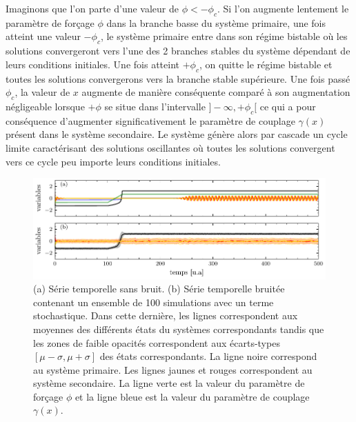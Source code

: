 
Imaginons que l’on parte d’une valeur de $\phi < - \phi_c$. Si l’on augmente lentement le paramètre de forçage $\phi$ dans la branche basse du système primaire, une fois atteint une valeur $-\phi_c$, le système primaire entre dans son régime bistable où les solutions convergeront vers l’une des 2 branches stables du système dépendant de leurs conditions initiales. Une fois atteint $+\phi_c$, on quitte le régime bistable et toutes les solutions convergerons vers la branche stable supérieure. Une fois passé $\phi_c$, la valeur de $x$ augmente de manière conséquente comparé à son augmentation négligeable lorsque $+\phi$ se situe dans l’intervalle $]-\infty, +\phi_c[$ ce qui a pour conséquence d’augmenter significativement le paramètre de couplage $\gamma(x)$ présent dans le système secondaire. Le système génère alors par cascade un cycle limite caractérisant des solutions oscillantes où toutes les solutions convergent vers ce cycle peu importe leurs conditions initiales.

\begin{figure}[ht!]
  \centering
  \includegraphics{figures/time-series.pdf}
  \caption{(a) Série temporelle sans bruit. (b) Série temporelle bruitée contenant un ensemble de 100 simulations avec un terme stochastique. Dans cette dernière, les lignes correspondent aux moyennes des différents états du systèmes correspondants tandis que les zones de faible opacités correspondent aux écarts-types $[\mu - \sigma, \mu + \sigma]$ des états correspondants. La ligne noire correspond au système primaire. Les lignes jaunes et rouges correspondent au système secondaire. La ligne verte est la valeur du paramètre de forçage $\phi$ et la ligne bleue est la valeur du paramètre de couplage $\gamma(x)$.}
  \label{fig:time-series}
\end{figure}

